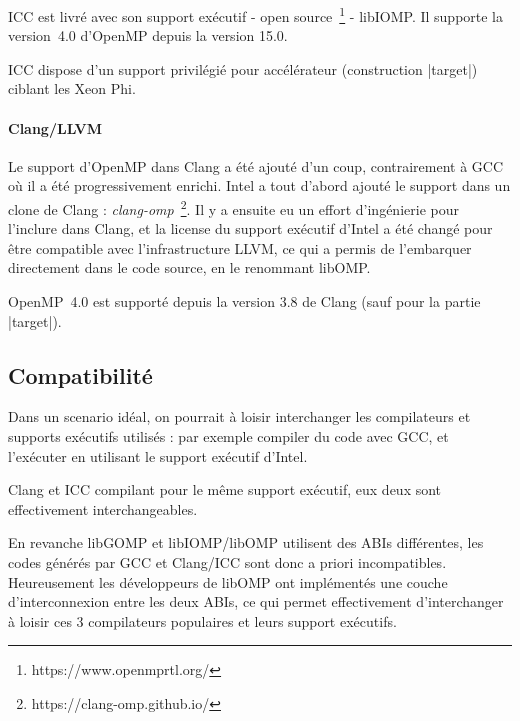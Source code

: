 ICC est livré avec son support exécutif - open source~\footnote{https://www.openmprtl.org/} - libIOMP.
Il supporte la version~4.0 d'OpenMP depuis la version 15.0.

ICC dispose d'un support privilégié pour accélérateur (construction |target|) ciblant les Xeon Phi.


\paragraph{Clang/LLVM}

Le support d'OpenMP dans Clang a été ajouté d'un coup, contrairement à GCC où il a été progressivement enrichi.
Intel a tout d'abord ajouté le support dans un clone de Clang : \emph{clang-omp}~\footnote{https://clang-omp.github.io/}.
Il y a ensuite eu un effort d'ingénierie pour l'inclure dans Clang, et la license du support exécutif d'Intel a été changé pour être compatible avec l'infrastructure LLVM, ce qui a permis de l'embarquer directement dans le code source, en le renommant libOMP.

OpenMP~4.0 est supporté depuis la version 3.8 de Clang (sauf pour la partie |target|).

\subsection{Compatibilité}

Dans un scenario idéal, on pourrait à loisir interchanger les compilateurs et supports exécutifs utilisés : par exemple compiler du code avec GCC, et l'exécuter en utilisant le support exécutif d'Intel.

Clang et ICC compilant pour le même support exécutif, eux deux sont effectivement interchangeables.

En revanche libGOMP et libIOMP/libOMP utilisent des ABIs différentes, les codes générés par GCC et Clang/ICC sont donc a priori incompatibles.
Heureusement les développeurs de libOMP ont implémentés une couche d'interconnexion entre les deux ABIs, ce qui permet effectivement d'interchanger à loisir ces 3 compilateurs populaires et leurs support exécutifs.
